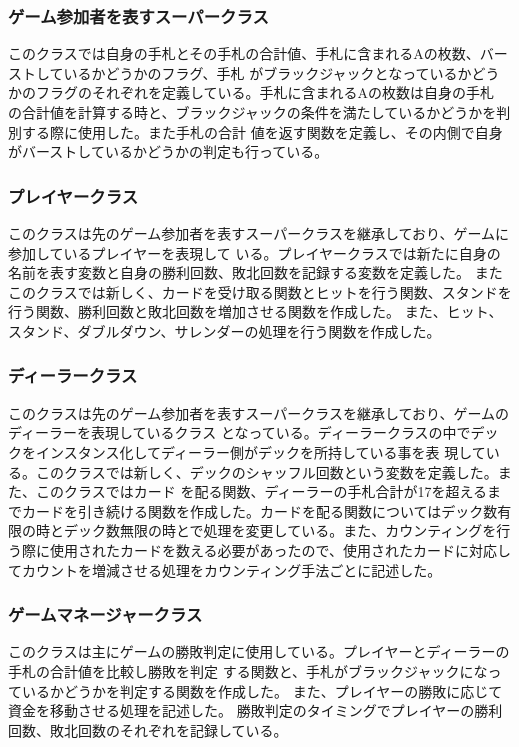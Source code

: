 \subsubsection{ゲーム参加者を表すスーパークラス}
このクラスでは自身の手札とその手札の合計値、手札に含まれるAの枚数、バーストしているかどうかのフラグ、手札
がブラックジャックとなっているかどうかのフラグのそれぞれを定義している。手札に含まれるAの枚数は自身の手札
の合計値を計算する時と、ブラックジャックの条件を満たしているかどうかを判別する際に使用した。また手札の合計
値を返す関数を定義し、その内側で自身がバーストしているかどうかの判定も行っている。

\subsubsection{プレイヤークラス}
このクラスは先のゲーム参加者を表すスーパークラスを継承しており、ゲームに参加しているプレイヤーを表現して
いる。プレイヤークラスでは新たに自身の名前を表す変数と自身の勝利回数、敗北回数を記録する変数を定義した。
またこのクラスでは新しく、カードを受け取る関数とヒットを行う関数、スタンドを行う関数、勝利回数と敗北回数を増加させる関数を作成した。
また、ヒット、スタンド、ダブルダウン、サレンダーの処理を行う関数を作成した。

\subsubsection{ディーラークラス}
このクラスは先のゲーム参加者を表すスーパークラスを継承しており、ゲームのディーラーを表現しているクラス
となっている。ディーラークラスの中でデックをインスタンス化してディーラー側がデックを所持している事を表
現している。このクラスでは新しく、デックのシャッフル回数という変数を定義した。また、このクラスではカード
を配る関数、ディーラーの手札合計が17を超えるまでカードを引き続ける関数を作成した。カードを配る関数についてはデック数有限の時とデック数無限の時とで処理を変更している。また、カウンティングを行う際に使用されたカードを数える必要があったので、使用されたカードに対応してカウントを増減させる処理をカウンティング手法ごとに記述した。

\subsubsection{ゲームマネージャークラス}
このクラスは主にゲームの勝敗判定に使用している。プレイヤーとディーラーの手札の合計値を比較し勝敗を判定
する関数と、手札がブラックジャックになっているかどうかを判定する関数を作成した。
また、プレイヤーの勝敗に応じて資金を移動させる処理を記述した。
勝敗判定のタイミングでプレイヤーの勝利回数、敗北回数のそれぞれを記録している。

